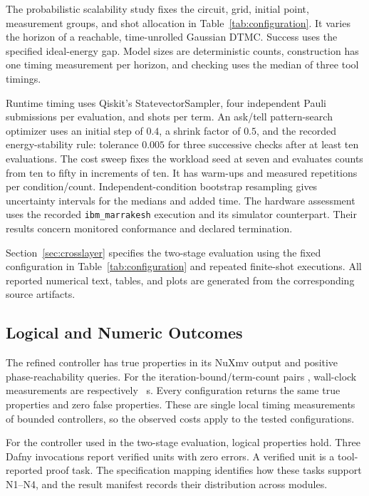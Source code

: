 \documentclass[conference]{IEEEtran}
\begin{document}
The probabilistic scalability study fixes the circuit, grid, initial point, measurement groups, and shot allocation in Table~\ref{tab:configuration}. It varies the horizon of a reachable, time-unrolled Gaussian DTMC. Success uses the specified ideal-energy gap. Model sizes are deterministic counts, construction has one timing measurement per horizon, and checking uses the median of three tool timings.

Runtime timing uses Qiskit's StatevectorSampler, four independent Pauli submissions per evaluation, and \ShotsPerGroup shots per term. An ask/tell pattern-search optimizer uses an initial step of $0.4$, a shrink factor of $0.5$, and the recorded energy-stability rule: tolerance $0.005$ for three successive checks after at least ten evaluations. The cost sweep fixes the workload seed at seven and evaluates counts from ten to fifty in increments of ten. It has \TimingWarmupsPerCell warm-ups and \TimingRepetitions measured repetitions per condition/count. Independent-condition bootstrap resampling gives uncertainty intervals for the medians and added time. The hardware assessment uses the recorded \texttt{ibm\_marrakesh} execution and its simulator counterpart. Their results concern monitored conformance and declared termination.

Section~\ref{sec:crosslayer} specifies the two-stage evaluation using the fixed configuration in Table~\ref{tab:configuration} and repeated finite-shot executions. All reported numerical text, tables, and plots are generated from the corresponding source artifacts.

\subsection{Logical and Numeric Outcomes}
The refined controller has \LegacyLogicalProperties true properties in its NuXmv output and \PhaseQueries positive phase-reachability queries. For the iteration-bound/term-count pairs \LogicalScalingPairs, wall-clock measurements are respectively \LogicalScalingTimes~s. Every configuration returns the same \LegacyLogicalProperties true properties and zero false properties. These are single local timing measurements of bounded controllers, so the observed costs apply to the tested configurations.

For the controller used in the two-stage evaluation, \LogicalProperties logical properties hold. Three Dafny invocations report \DafnyChecks verified units with zero errors. A verified unit is a tool-reported proof task. The specification mapping identifies how these tasks support N1--N4, and the result manifest records their distribution across modules.
\end{document}
